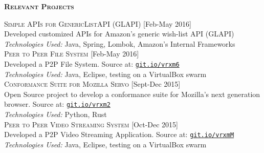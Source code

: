 \documentclass[letterpaper,12pt,final]{memoir}
\newcommand{\SmallSep}{\vspace{0.5em}}
\newcommand{\CVSection}[1]
	{\Large\textbf{\textsc{{#1}}}\par
	\SmallSep\normalsize\normalfont}
\newcommand{\CVItem}[1]
	{\textsc{\color{Plum} #1}}
\newcommand{\plumBox}[1]
{\space\space\fbox{\tiny \textbf{{#1}}}}
\newcommand{\RightAlignedInlineText}[1]
{{\footnotesize \color{Plum}  \hfill [#1]}}
\begin{document}
\CVSection{Relevant Projects}
\CVItem{Simple APIs for GenericListAPI (GLAPI) } \RightAlignedInlineText{Feb-May 2016}\\
{\footnotesize Developed customized APIs for Amazon's generic wish-list API (GLAPI) \\\color{Black}
	\emph{Technologies Used:} Java, Spring, Lombok, Amazon's Internal Frameworks}%
\SmallSep\\
\CVItem{Peer to Peer File System} \RightAlignedInlineText{Feb-May 2016}\\
{\footnotesize Developed a P2P File System. Source at: \color{Plum} \href{https://git.io/vrxm6}{\space\space\texttt{git.io/vrxm6}} \\\color{Black}
	\emph{Technologies Used:} Java, Eclipse, testing on a VirtualBox swarm}%
\SmallSep\\
\CVItem{Conformance Suite for Mozilla Servo} \plumBox{Open Source} \RightAlignedInlineText{Sept-Dec 2015}\\
{\footnotesize Open Source project to develop a conformance suite for Mozilla's next generation browser. Source at: \color{Plum} \href{https://git.io/vrxm2}{\space\space\texttt{git.io/vrxm2}} \\\color{Black}
	\emph{Technologies Used:} Python, Rust}%
\SmallSep\\
\CVItem{Peer to Peer Video Streaming System} \RightAlignedInlineText{Oct-Dec 2015}\\
{\footnotesize Developed a P2P Video Streaming Application. Source at: \color{Plum} \href{https://git.io/vrxmM}{\space\space\texttt{git.io/vrxmM}} \\\color{Black}
	\emph{Technologies Used:} Java, Eclipse, testing on a VirtualBox swarm}%
\SmallSep\\
\end{document}
